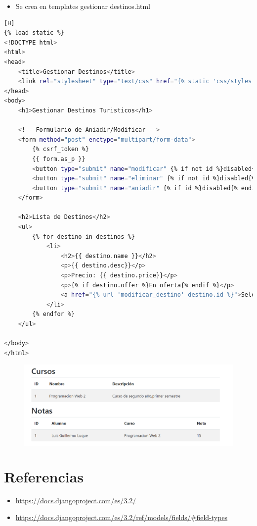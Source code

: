 \documentclass{article}
\begin{document}
	\begin{itemize}
		\item Se crea en templates gestionar destinos.html
	\end{itemize}	
\begin{lstlisting}[language=bash,caption={Html de gestionar destinos.html}][H]
{% load static %}
<!DOCTYPE html>
<html>
<head>
    <title>Gestionar Destinos</title>
    <link rel="stylesheet" type="text/css" href="{% static 'css/styles.css' %}">
</head>
<body>
    <h1>Gestionar Destinos Turisticos</h1>
    
    <!-- Formulario de Aniadir/Modificar -->
    <form method="post" enctype="multipart/form-data">
        {% csrf_token %}
        {{ form.as_p }}
        <button type="submit" name="modificar" {% if not id %}disabled{% endif %}>Modificar</button>
        <button type="submit" name="eliminar" {% if not id %}disabled{% endif %}>Eliminar</button>
        <button type="submit" name="aniadir" {% if id %}disabled{% endif %}>Anadir</button>
    </form>
    
    <h2>Lista de Destinos</h2>
    <ul>
        {% for destino in destinos %}
            <li>
                <h2>{{ destino.name }}</h2>
                <p>{{ destino.desc}}</p>
                <p>Precio: {{ destino.price}}</p>
                <p>{% if destino.offer %}En oferta{% endif %}</p>
                <a href="{% url 'modificar_destino' destino.id %}">Seleccionar</a>
            </li>
        {% endfor %}
    </ul>
    
</body>
</html>

	\end{lstlisting}
	\begin{figure}[H]
		\centering
		\includegraphics[width=1.0\textwidth,keepaspectratio]{img/Vista3.png}
	\end{figure}
\section{Referencias}
\begin{itemize}			
	\item \url{https://docs.djangoproject.com/es/3.2/}
	\item\url{https://docs.djangoproject.com/es/3.2/ref/models/fields/#field-types}
\end{itemize}	
	
%
%
%
			
\end{document}
